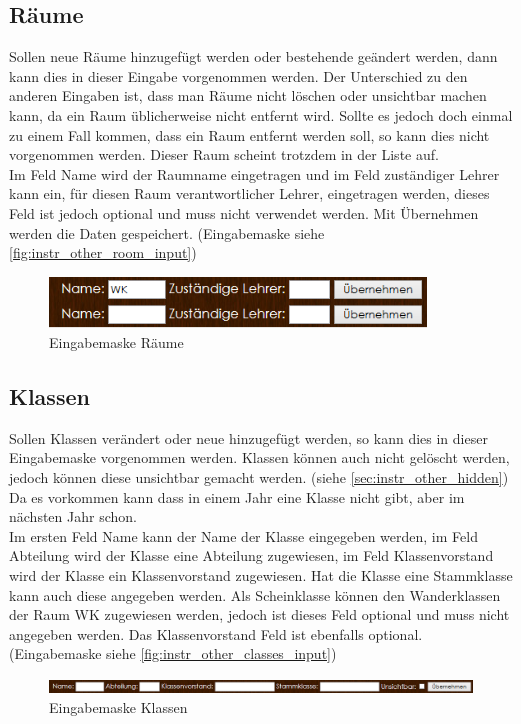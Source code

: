\subsection{Räume}
Sollen neue Räume hinzugefügt werden oder bestehende geändert werden, dann kann dies in dieser Eingabe vorgenommen werden. Der Unterschied zu den anderen Eingaben ist, dass man Räume nicht löschen oder unsichtbar machen kann, da ein Raum üblicherweise nicht entfernt wird. Sollte es jedoch doch einmal zu einem Fall kommen, dass ein Raum entfernt werden soll, so kann dies nicht vorgenommen werden. Dieser Raum scheint trotzdem in der Liste auf.\\
Im Feld Name wird der Raumname eingetragen und im Feld zuständiger Lehrer kann ein, für diesen Raum verantwortlicher Lehrer, eingetragen werden, dieses Feld ist jedoch optional und muss nicht verwendet werden. Mit Übernehmen werden die Daten gespeichert. (Eingabemaske siehe \autoref{fig:instr_other_room_input})
\begin{figure}[H]
\centering
\includegraphics[keepaspectratio=true, width=10cm]{images/screenshots/rooms_input.png}
\caption{Eingabemaske Räume}
\label{fig:instr_other_room_input}
\end{figure}
\subsection{Klassen}
Sollen Klassen verändert oder neue hinzugefügt werden, so kann dies in dieser Eingabemaske vorgenommen werden. Klassen können auch nicht gelöscht werden, jedoch können diese unsichtbar gemacht werden. (siehe \autoref{sec:instr_other_hidden}) Da es vorkommen kann dass in einem Jahr eine Klasse nicht gibt, aber im nächsten Jahr schon.\\
Im ersten Feld Name kann der Name der Klasse eingegeben werden, im Feld Abteilung wird der Klasse eine Abteilung zugewiesen, im Feld Klassenvorstand wird der Klasse ein Klassenvorstand zugewiesen. Hat die Klasse eine Stammklasse kann auch diese angegeben werden. Als Scheinklasse können den Wanderklassen der Raum WK zugewiesen werden, jedoch ist dieses Feld optional und muss nicht angegeben werden. Das Klassenvorstand Feld ist ebenfalls optional. (Eingabemaske siehe \autoref{fig:instr_other_classes_input})
\begin{figure}[H]
\centering
\includegraphics[keepaspectratio=true, width=17cm]{images/screenshots/classes_input.png}
\caption{Eingabemaske Klassen}
\label{fig:instr_other_classes_input}
\end{figure}

